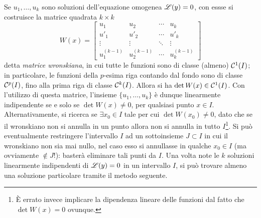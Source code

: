 Se $u_1,\dots,u_k$ sono soluzioni dell'equazione omogenea $\mathscr L(y)=0$, con essse si costruisce la matrice quadrata $k\times k$
\[
W(x)=\begin{bmatrix}
u_1			&u_2				&\cdots	&u_k\\
u'_1			&u'_2			&\cdots	&u'_k\\
\vdots		&\vdots			&\ddots	&\vdots\\
u^{(k-1)}_1	&u^{(k-1)}_2		&\cdots	&u^{(k-1)}_k
\end{bmatrix}
\]
detta \emph{matrice wronskiana}, in cui tutte le funzioni sono di classe (almeno) $\mathcal{C}^{{1}}(I)$; in particolare, le funzioni della $p$-esima riga contando dal fondo sono di classe $\mathcal{C}^{{p}}(I)$, fino alla prima riga di classe $\mathcal{C}^{{k}}(I)$. Allora si ha $\det W(x)\in\mathcal{C}^{{1}}(I)$.
Con l'utilizzo di questa matrice, l'insieme $\{u_1,\dots,u_k\}$ è dunque linearmente indipendente se e solo se $\det W(x)\neq 0$, per qualsiasi punto $x\in I$. Alternativamente, si ricerca se $\exists x_0\in I$ tale per cui $\det W(x_0)\neq 0$, dato che se il wronskiano non si annulla in un punto allora non si annulla in tutto $I$\footnote{È errato invece implicare la dipendenza lineare delle funzioni dal fatto che $\det W(x)=0$ ovunque.}.
Si può eventualmente restringere l'intervallo $I$ ad un sottoinsieme $J\subset I$ in cui il wronskiano non sia mai nullo, nel caso esso si annullasse in qualche $x_0\in I$ (ma ovviamente $\notin J$!): basterà eliminare tali punti da $I$.
Una volta note le $k$ soluzioni linearmente indipendenti di $\mathscr L(y)=0$ in un intervallo $I$, si può trovare almeno una soluzione particolare tramite il metodo seguente.

